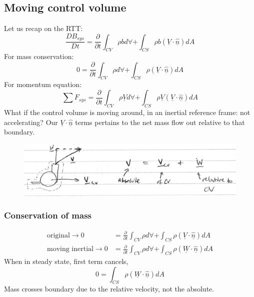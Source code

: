 \documentclass[class=report, crop=false, 12pt,a4paper]{standalone}
\begin{document}
\subsection{Moving control volume}
Let us recap on the RTT:
\begin{equation}
  \frac{DB_{sys}}{Dt} = \frac{\partial}{\partial t} \int_{CV} \rho b d \forall + \int_{CS} \rho b (\underline{V}\cdot \underline{\hat{n}}) dA 
\end{equation}
For mass conservation:
\begin{equation}
  0 = \frac{\partial}{\partial t} \int_{CV} \rho d \forall + \int_{CS} \rho (\underline{V}\cdot \underline{\hat{n}}) dA 
\end{equation}
For momentum equation:
\begin{equation}
  \sum F_{sys} = \frac{\partial}{\partial t} \int_{CV} \rho \underline{V} d \forall + \int_{CS} \rho \underline{V} (\underline{V}\cdot \underline{\hat{n}}) dA 
\end{equation}
What if the control volume is moving around, in an inertial reference frame: not accelerating? Our $\underline{V} \cdot \underline{\hat{n}}$ terms pertains to the net mass flow out relative to that boundary.
\begin{figure}
  \centering
  \includegraphics[width = \textwidth]{../img/RTTMovingControlVolume}
\end{figure}
\subsubsection{Conservation of mass}
\begin{align}
  \textrm{original} \rightarrow 0 &= \frac{\partial}{\partial t} \int_{CV} \rho d \forall + \int_{CS} \rho (\underline{V}\cdot \underline{\hat{n}}) dA \\
  \textrm{moving inertial} \rightarrow 0 &= \frac{\partial}{\partial t} \int_{CV} \rho d \forall + \int_{CS} \rho (\underline{W}\cdot \underline{\hat{n}}) dA
\end{align}
When in steady state, first term cancels,
\begin{equation}
  0 = \int_{CS} \rho (\underline{W}\cdot \underline{\hat{n}}) dA 
\end{equation}
Mass crosses boundary due to the relative velocity, not the absolute.
\end{document}
